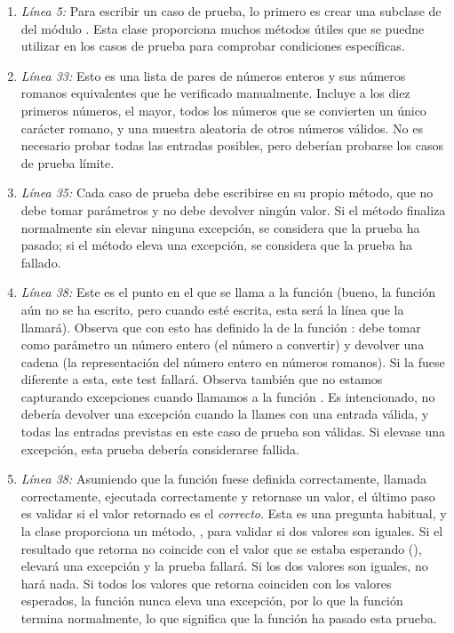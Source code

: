 \begin{enumerate}

\item \emph{Línea 5:} Para escribir un caso de prueba, lo primero es crear una subclase de  del módulo . Esta clase proporciona muchos métodos útiles que se puedne utilizar en los casos de prueba para comprobar condiciones específicas.

\item \emph{Línea 33:} Esto es una lista de pares de números enteros y sus números romanos equivalentes que he verificado manualmente. Incluye a los diez primeros números, el mayor, todos los números que se convierten un único carácter romano, y una muestra aleatoria de otros números válidos. No es necesario probar todas las entradas posibles, pero deberían probarse los casos de prueba límite.

\item \emph{Línea 35:} Cada caso de prueba debe escribirse en su propio método, que no debe tomar parámetros y no debe devolver ningún valor. Si el método finaliza normalmente sin elevar ninguna excepción, se considera que la prueba ha pasado; si el método eleva una excepción, se considera que la prueba ha fallado.

\item \emph{Línea 38:} Este es el punto en el que se llama a la función  (bueno, la función aún no se ha escrito, pero cuando esté escrita, esta será la línea que la llamará). Observa que con esto has definido la  de la función : debe tomar como parámetro un número entero (el número a convertir) y devolver una cadena (la representación del número entero en números romanos). Si la  fuese diferente a esta, este test fallará. Observa también que no estamos capturando excepciones cuando llamamos a la función . Es intencionado,  no debería devolver una excepción cuando la llames con una entrada válida, y todas las entradas previstas en este caso de prueba son válidas. Si  elevase una excepción, esta prueba debería considerarse fallida.

\item \emph{Línea 38:} Asumiendo que la función  fuese definida correctamente, llamada correctamente, ejecutada correctamente y retornase un valor, el último paso es validar si el valor retornado es el \emph{correcto}. Esta es una pregunta habitual, y la clase  proporciona un método, , para validar si dos valores son iguales. Si el resultado que retorna  no coincide con el valor que se estaba esperando (),  elevará una excepción y la prueba fallará. Si los dos valores son iguales,  no hará nada. Si todos los valores que retorna  coinciden con los valores esperados, la función  nunca eleva una excepción, por lo que la función  termina normalmente, lo que significa que la función  ha pasado esta prueba.


\end{enumerate}

